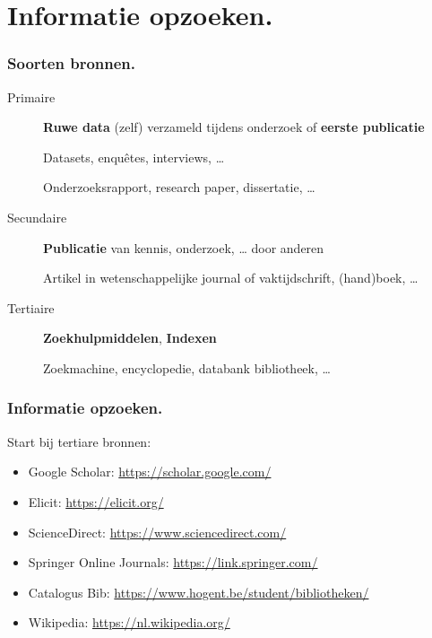 \documentclass[aspectratio=169]{beamer}
\begin{document}
\section{Informatie opzoeken.}

\begin{frame}
  \frametitle{Soorten bronnen.}

  \begin{description}
    \item[Primaire] \textbf{Ruwe data} (zelf) verzameld tijdens onderzoek of \textbf{eerste publicatie}

      Datasets, enquêtes, interviews, \ldots

      Onderzoeksrapport, research paper, dissertatie, \ldots

    \item[Secundaire] \textbf{Publicatie} van kennis, onderzoek, {\ldots} door anderen

      Artikel in wetenschappelijke journal of vaktijdschrift, (hand)boek, \ldots

    \item[Tertiaire] \textbf{Zoekhulpmiddelen}, \textbf{Indexen}

      Zoekmachine, encyclopedie, databank bibliotheek, \ldots

  \end{description}

\end{frame}

\begin{frame}
  \frametitle{Informatie opzoeken.}

  Start bij \alert{tertiare} bronnen:

  \begin{itemize}
    \item Google Scholar: \url{https://scholar.google.com/}
    \item Elicit: \url{https://elicit.org/}
    \item ScienceDirect: \url{https://www.sciencedirect.com/}
    \item Springer Online Journals: \url{https://link.springer.com/}
    \item Catalogus Bib: \url{https://www.hogent.be/student/bibliotheken/}
    \item Wikipedia: \url{https://nl.wikipedia.org/}
  \end{itemize}
\end{frame}
\end{document}
